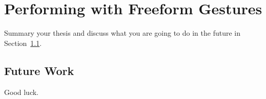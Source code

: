 \chapter{Performing with Freeform Gestures}
\label{cha:freeform}
Summary your thesis and discuss what you are going to do in the future in Section~\ref{sec:future}.


\section{Future Work}
\label{sec:future}
Good luck.




